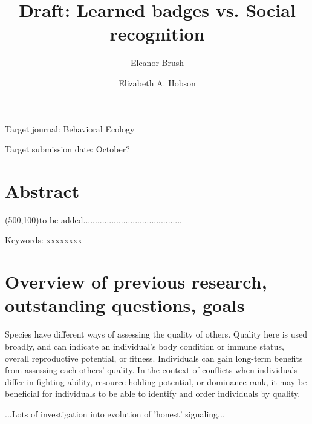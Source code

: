 

\noindent
\title{Draft: Learned badges vs. Social recognition} 

\author[1]{Eleanor Brush}
\author[2,3,4]{Elizabeth A. Hobson}
\maketitle

Target journal: Behavioral Ecology 

Target submission date: October?
\linenumbers

\section*{Abstract}

\framebox(500,100){to be added..........................................}

Keywords: xxxxxxxx
\newline

\section*{Overview of previous research, outstanding questions, goals} 

Species have different ways of assessing the quality of others. Quality here is used broadly, and can indicate an individual's body condition or immune status, overall reproductive potential, or fitness. Individuals can gain long-term benefits from assessing each others' quality. In the context of conflicts when individuals differ in fighting ability, resource-holding potential, or dominance rank, it may be beneficial for individuals to be able to identify and order individuals by quality. 

...Lots of investigation into evolution of 'honest' signaling...  


